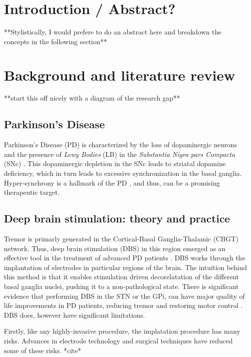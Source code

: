 \tableofcontents
\newpage

\section{Introduction / Abstract?}
**Stylistically, I would prefere to do an abstract here and breakdown the concepts in the
following section**
\section{Background and literature review}
**start this off nicely with a diagram of the research gap**

\subsection{Parkinson's Disease}
Parkinson's Disease (PD) is characterized by the loss of dopaminergic neurons and the presence of
\emph{Lewy Bodies} (LB) in the \emph{Substantia Nigra pars Compacta} (SNc)
\cite{del2018advances}. This dopaminergic depletion in the SNc leads to striatal dopamine
deficiency, which in turn leads to excessive synchronization in the basal ganglia.
Hyper-synchrony is a hallmark of the PD \cite{hammond2007pathological, helmich2012cerebral},
and thus, can be a promising therapeutic target.

\subsection{Deep brain stimulation: theory and practice}
Tremor is primarly generated in the Cortical-Basal Ganglia-Thalamic (CBGT) network.
Thus, deep brain stimulation (DBS) in this region emerged as an effective tool in
the treatment of advanced PD patients \cite{del2018advances}.
DBS works through the implantation of electrodes in particular regions
of the brain.
The intuition behind this method is that it enables stimulation driven decorelatation of the
different basal ganglia nuclei, pushing it to a non-pathological state.
There is significant evidence that performing DBS in the STN or the GPi, can have major quality
of life improvements in PD patients, reducing tremor and restoring motor control
\cite{rodriguez2005bilateral}.
DBS does, however have significant limitations.

Firstly, like any highly-invasive procedure, the implatation procedure has many risks.
Advances in electrode technology and surgical techniques have reduced some of these risks.
*cite*


